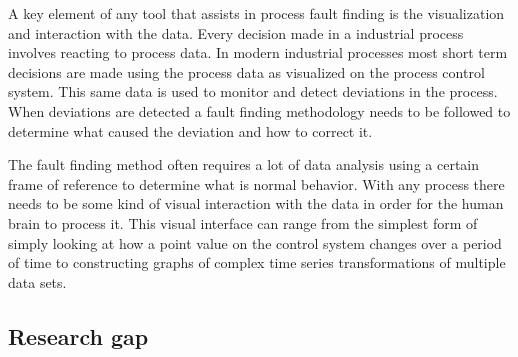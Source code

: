 A key element of any tool that assists in process fault finding is the visualization and interaction with the data. Every decision made in a industrial process involves reacting to process data. In modern industrial processes most short term decisions are made using the process data as visualized on the process control system. This same data is used to monitor and detect deviations in the process. When deviations are detected a fault finding methodology needs to be followed to determine what caused the deviation and how to correct it.\par
The fault finding method often requires a lot of data analysis using a certain frame of reference to determine what is normal behavior. With any process there needs to be some kind of visual interaction with the data in order for the human brain to process it. This visual interface can range from the simplest form of simply looking at how a point value on the control system changes over a period of time to constructing graphs of complex time series transformations of multiple data sets.\par

\subsection{Research gap}

